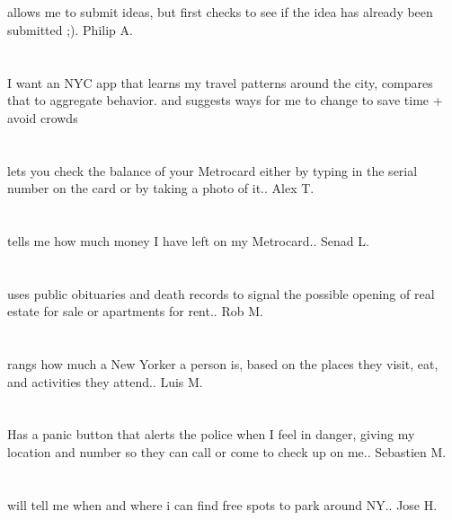 \section{}allows me to submit ideas,  but first checks to see if the idea has already been submitted ;). Philip A.
\section{}  I want an NYC app that learns my travel patterns around the city,  compares that to aggregate behavior.  and suggests ways for me to change to save time + avoid crowds
\section{}lets you check the balance of your Metrocard either by typing in the serial number on the card or by taking a photo of it.. Alex T.
\section{}tells me how much money I have left on my Metrocard.. Senad L.
\section{}uses public obituaries and death records to signal the possible opening of real estate for sale or apartments for rent.. Rob M.
\section{} rangs how much a New Yorker a person is,  based on the places they visit,  eat,  and activities they attend.. Luis M.
\section{}Has a panic button that alerts the police when I feel in danger,  giving my location and number so they can call or come to check up on me.. Sebastien M.
\section{}will tell me when and where i can find free spots to park around NY.. Jose H.
